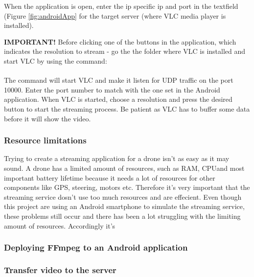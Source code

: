 
When the application is open, enter the ip specific ip and port in the textfield (Figure \ref{fig:androidApp} for the target server (where VLC media player is installed).


\textbf{IMPORTANT!} Before clicking one of the buttons in the application, which indicates the resolution to stream - go the the folder where VLC is installed and start VLC by using the command:\\

\\

The command will start VLC and make it listen for UDP traffic on the port 10000. Enter the port number to match with the one set in the Android application.
When VLC is started, choose a resolution and press the desired button to start the streaming process. Be patient as VLC has to buffer some data before it will show the video.

\subsubsection{Resource limitations}
Trying to create a streaming application for a drone isn't as easy as it may sound. A drone has a limited amount of resources, such as RAM, CPUand most important battery lifetime because it needs a lot of resources for other components like GPS, steering, motors etc. Therefore it's very important that the streaming service dosn't use too much resources and are effecient. Even though this project are using an Android smartphone to simulate the streaming service, these problems still occur and there has been a lot struggling with the limiting amount of resources. Accordingly it's

\subsubsection{Deploying FFmpeg to an Android application}

\subsubsection{Transfer video to the server}
